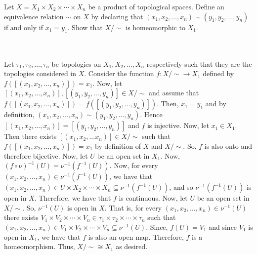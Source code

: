 Let $X=X_1\times X_2\times \cdots \times X_n$ be a product of topological spaces. Define an equivalence
relation $\sim$ on $X$ by declaring that $(x_1, x_2, \ldots,x_n)\sim (y_1,y_2,\ldots,y_n)$ if and only
if $x_1 = y_1$. Show that $X/\sim$ is homeomorphic to $X_1$.\\\\

\begin{solution}\renewcommand{\qedsymbol}{}\ \\
    Let $\tau_1, \tau_2,\ldots, \tau_n$ be topologies on $X_1, X_2,\ldots, X_n$ respectively such that
    they are the topologies considered in $X$. Consider the function $f:X/\sim\rightarrow X_1$ defined
    by $f([(x_1, x_2,\ldots, x_n)])=x_1$. Now, let
    $[(x_1, x_2,\ldots, x_n)],[(y_1, y_2,\ldots, y_n)]\in X/\sim$ and assume that
    $f([(x_1, x_2,\ldots, x_n)])=f([(y_1, y_2,\ldots, y_n)])$. Then, $x_1=y_1$ and by definition,
    $(x_1, x_2, \ldots,x_n)\sim (y_1,y_2,\ldots,y_n)$. Hence
    $[(x_1, x_2, \ldots,x_n)]=[(y_1,y_2,\ldots,y_n)]$ and $f$ is injective. Now, let $x_1\in X_1$. Then
    there exists $[(x_1, x_2,\ldots x_n)]\in X/\sim$ such that $f([(x_1, x_2,\ldots, x_n)])=x_1$ by
    definition of $X$ and $X/\sim$. So, $f$ is also onto and therefore bijective. Now, let $U$ be an
    open set in $X_1$. Now, $(f\circ\nu)^{-1}(U)=\nu^{-1}(f^{-1}(U))$. Now, for every
    $(x_1, x_2,\ldots, x_n)\in\nu^{-1}(f^{-1}(U))$, we have that
    $(x_1, x_2,\ldots, x_n)\in U\times X_2\times\cdots\times X_n\subseteq\nu^{-1}(f^{-1}(U))$, and so
    $\nu^{-1}(f^{-1}(U))$ is open in $X$. Therefore, we have that $f$ is continuous. Now, let $U$ be an
    open set in $X/\sim$. So, $\nu^{-1}(U)$ is open in $X$. That is, for every
    $(x_1, x_2,\ldots, x_n)\in\nu^{-1}(U)$ there exists
    $V_1\times V_2\times\cdots\times V_n\in\tau_1\times\tau_2\times\cdots\times\tau_n$ such that
    $(x_1, x_2,\ldots, x_n)\in V_1\times V_2\times\cdots\times V_n\subseteq\nu^{-1}(U)$. Since,
    $f(U)=V_1$ and since $V_1$ is open in $X_1$, we have that $f$ is also an open map. Therefore, $f$ is
    a homeomorphism. Thus, $X/\sim\cong X_1$ as desired.

\end{solution}